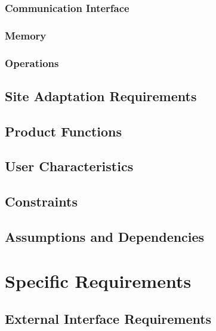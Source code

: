 \documentclass[a4paper,12pt]{article}
\begin{document}
            \subsubsection{Communication Interface}
            
            \subsubsection{Memory}
            
            \subsubsection{Operations}
            
            \subsection{Site Adaptation Requirements}
            
        \subsection{Product Functions}
        
        \subsection{User Characteristics}
        
        \subsection{Constraints}
        
        \subsection{Assumptions and Dependencies}
        
    \section{Specific Requirements}
    
    	\subsection{External Interface Requirements}
    	
\end{document}
